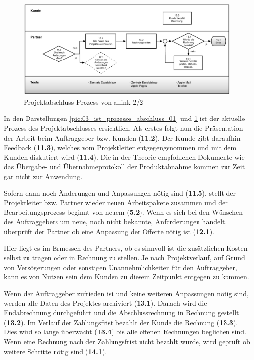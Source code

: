 \begin{figure}[p]
\begin{center}
\includegraphics[width=0.99\textwidth,angle=0]{./bilder/analyse/03_ist_prozesse_abschluss_02.pdf}
\caption[Projektabschluss Prozess von allink 2/2]{Projektabschluss 
    Prozess von allink 2/2\footnotemark}
\label{pic:03_ist_prozesse_abschluss_02}
\end{center}
\end{figure}

In den Darstellungen \ref{pic:03_ist_prozesse_abschluss_01} und
\ref{pic:03_ist_prozesse_abschluss_02} ist der aktuelle Prozess des Projektabschlusses 
ersichtlich. Als erstes folgt nun die Präsentation der Arbeit beim Auftraggeber 
bzw. Kunden (\textbf{11.2}). Der Kunde gibt daraufhin Feedback (\textbf{11.3}), 
welches vom Projektleiter entgegengenommen und mit dem Kunden diskutiert wird (\textbf{11.4}).
Die in der Theorie empfohlenen Dokumente wie das Übergabe- und Übernahmeprotokoll
der Produktabnahme kommen zur Zeit gar nicht zur Anwendung.

Sofern dann noch Änderungen und Anpassungen nötig sind (\textbf{11.5}), stellt
der Projektleiter bzw. Partner wieder neuen Arbeitspakete zusammen und der
Bearbeitungsprozess beginnt von neuem (\textbf{5.2}). Wenn es sich bei den Wünschen
des Auftraggebers um neue, noch nicht bekannte, Anforderungen handelt, überprüft
der Partner ob eine Anpassung der Offerte nötig ist (\textbf{12.1}).

Hier liegt es im Ermessen des Partners, ob es sinnvoll ist die zusätzlichen Kosten 
selbst zu tragen oder in Rechnung zu stellen. Je nach Projektverlauf, auf Grund von
Verzögerungen oder sonstigen Unannehmlichkeiten für den Auftraggeber, kann es
von Nutzen sein dem Kunden zu diesem Zeitpunkt entgegen zu kommen.

Wenn der Auftraggeber zufrieden ist und keine weiteren Anpassungen nötig sind, 
werden alle Daten des Projektes archiviert (\textbf{13.1}). Danach wird die
Endabrechnung durchgeführt und die Abschlussrechnung in Rechnung gestellt (\textbf{13.2}).
Im Verlauf der Zahlungsfrist bezahlt der Kunde die Rechnung (\textbf{13.3}).
Dies wird so lange überwacht (\textbf{13.4}) bis alle offenen Rechnungen beglichen
sind. Wenn eine Rechnung nach der Zahlungsfrist nicht bezahlt wurde, wird
geprüft ob weitere Schritte nötig sind (\textbf{14.1}).

